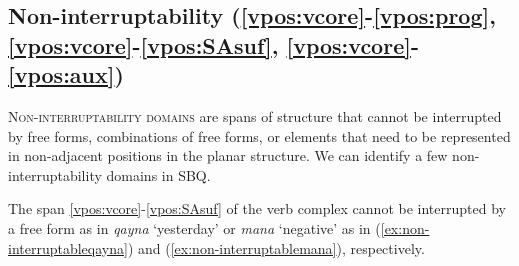 \documentclass[output=paper]{langscibook}
\begin{document}













\subsection{Non-interruptability (\ref{vpos:vcore}-\ref{vpos:prog}, \ref{vpos:vcore}-\ref{vpos:SAsuf}, \ref{vpos:vcore}-\ref{vpos:aux})}
\label{sbq:sec:non-interruptability}

\textsc{Non-interruptability domains} are spans of structure that cannot be interrupted by free forms, combinations of free forms, or elements that need to be represented in non-adjacent positions in the planar structure. We can identify a few non-interruptability domains in SBQ.


The span \ref{vpos:vcore}-\ref{vpos:SAsuf} of the verb complex cannot be interrupted by a free form as in \textit{qayna} `yesterday' or \textit{mana} `negative' as in (\ref{ex:non-interruptableqayna}) and (\ref{ex:non-interruptablemana}), respectively.
\end{document}
